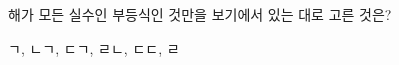 \hspace*{2mm}\begin{minipage}[t]{\dimexpr\linewidth-2mm\relax}\vspace{0pt}
해가 모든 실수인 부등식인 것만을 보기에서 있는 대로 고른 것은?
\begin{choices32}{ㄱ, ㄴ}{ㄱ, ㄷ}{ㄱ, ㄹ}{ㄴ, ㄷ}{ㄷ, ㄹ}\end{choices32}\end{minipage}
